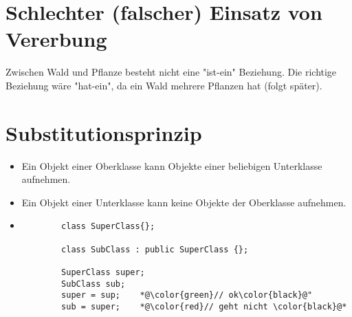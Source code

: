 \section{Schlechter (falscher) Einsatz von Vererbung}
\label{sec:Schlechter (falscher) Einsatz von Vererbung}
Zwischen Wald und Pflanze besteht nicht eine "ist-ein" Beziehung. Die richtige Beziehung wäre "hat-ein", da ein Wald mehrere Pflanzen hat (folgt später).


\section{Substitutionsprinzip}
\label{sec:Substitutionsprinzip}
\begin{itemize}
	\item Ein Objekt einer Oberklasse kann Objekte einer beliebigen Unterklasse aufnehmen.
	\item Ein Objekt einer Unterklasse kann keine Objekte der Oberklasse aufnehmen.
	\item[\-]
	\noindent
	\begin{minipage}{\linewidth}
		\begin{lstlisting}
		class SuperClass{}; 
		
		class SubClass : public SuperClass {};
		
		SuperClass super;
		SubClass sub;
		super = sup; 	*@\color{green}// ok\color{black}@"
		sub = super;	*@\color{red}// geht nicht \color{black}@*
		\end{lstlisting}
	\end{minipage}
\end{itemize}












